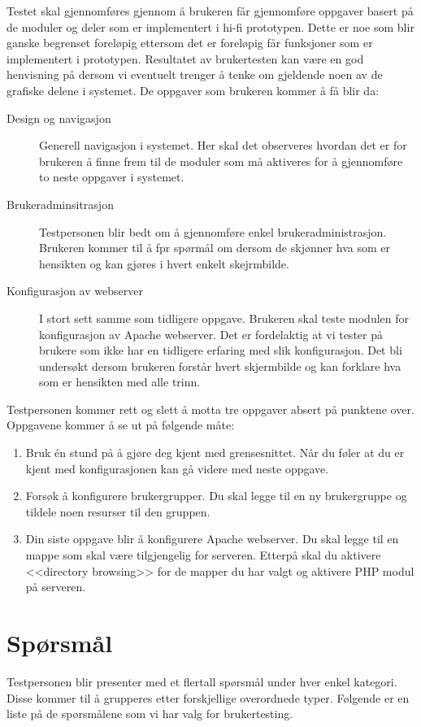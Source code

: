 Testet skal gjennomføres gjennom å brukeren får gjennomføre oppgaver basert på de moduler og deler som er implementert i hi-fi prototypen. Dette er noe som blir ganske begrenset foreløpig ettersom det er foreløpig får funksjoner som er implementert i prototypen. Resultatet av brukertesten kan være en god henvisning på dersom  vi eventuelt trenger å tenke om gjeldende noen av de grafiske delene i systemet. 
De oppgaver som brukeren kommer å få blir da:
\begin{description}
\item[Design og navigasjon]
Generell navigasjon i systemet. Her skal det observeres hvordan det er for brukeren å finne frem til de moduler som må aktiveres for å gjennomføre to neste oppgaver i systemet.
\item[Brukeradminsitrasjon]
Testpersonen blir bedt om å gjennomføre enkel brukeradministrasjon. Brukeren kommer til å fpr spørmål om dersom de skjønner hva som er hensikten og kan gjøres i hvert enkelt skejrmbilde.
\item[Konfigurasjon av webserver]
I stort sett samme som tidligere oppgave. Brukeren skal teste modulen for konfigurasjon av Apache webserver. Det er fordelaktig at vi tester på brukere som ikke har en tidligere erfaring med slik konfigurasjon. Det bli undersøkt dersom brukeren forstår hvert skjermbilde og kan forklare hva som er hensikten med alle trinn.
\end{description}
Testpersonen kommer rett og slett å motta tre oppgaver absert på punktene over. Oppgavene kommer å se ut på følgende måte:
\begin{enumerate}
\setlength{\itemsep}{1pt}
\setlength{\parskip}{0pt}
\setlength{\parsep}{0pt}

\item Bruk én stund på å gjøre deg kjent med grensesnittet. Når du føler at du er kjent med konfigurasjonen kan gå videre med neste oppgave.
\item Forsøk å konfigurere brukergrupper. Du skal legge til en ny brukergruppe og tildele noen resurser til den gruppen.
\item Din siste oppgave blir å konfigurere Apache webserver. Du skal legge til en mappe som skal være tilgjengelig for serveren. Etterpå skal du aktivere <<directory browsing>> for de mapper du har valgt og aktivere PHP modul på serveren.
\end{enumerate}

\section{Spørsmål}
Testpersonen blir presenter med et flertall spørsmål under hver enkel kategori. Disse kommer til å grupperes etter forskjellige overordnede typer. Følgende er en liste på de spørsmålene som vi har valg for brukertesting.

